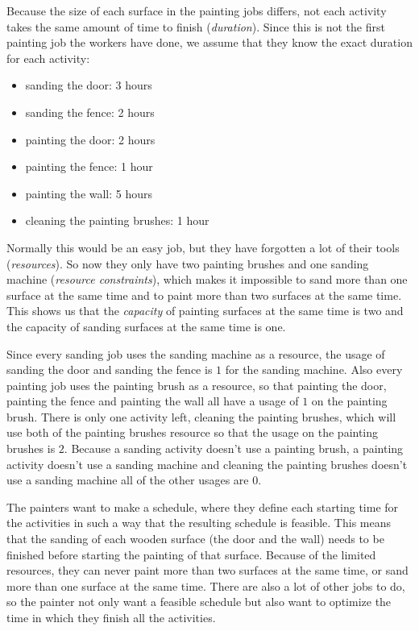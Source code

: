 \documentclass{article}
\theoremstyle{definition}
\begin{document}
Because the size of each surface in the painting jobs differs, not each activity takes the same amount of time to finish (\emph{duration}).
Since this is not the first painting job the workers have done, we assume that they know the exact duration for each activity:
\begin{itemize}
\item sanding the door: 3 hours
\item sanding the fence: 2 hours
\item painting the door: 2 hours
\item painting the fence: 1 hour
\item painting the wall: 5 hours
\item cleaning the painting brushes: 1 hour
\end{itemize}
Normally this would be an easy job, but they have forgotten a lot of their tools (\emph{resources}).
So now they only have two painting brushes and one sanding machine (\emph{resource constraints}), which makes it impossible to sand more than one surface at the same time and to paint more than two surfaces at the same time.
This shows us that the \emph{capacity} of painting surfaces at the same time is two and the capacity of sanding surfaces at the same time is one.

Since every sanding job uses the sanding machine as a resource, the usage of sanding the door and sanding the fence is $1$ for the sanding machine.
Also every painting job uses the painting brush as a resource, so that painting the door, painting the fence and painting the wall all have a usage of $1$ on the painting brush.
There is only one activity left, cleaning the painting brushes, which will use both of the painting brushes resource so that the usage on the painting brushes is $2$.
Because a sanding activity doesn't use a painting brush, a painting activity doesn't use a sanding machine and cleaning the painting brushes doesn't use a sanding machine all of the other usages are $0$.

The painters want to make a schedule, where they define each starting time for the activities in such a way that the resulting schedule is feasible.
This means that the sanding of each wooden surface (the door and the wall) needs to be finished before starting the painting of that surface.
Because of the limited resources, they can never paint more than two surfaces at the same time, or sand more than one surface at the same time.
There are also a lot of other jobs to do, so the painter not only want a feasible schedule but also want to optimize the time in which they finish all the activities.
\end{document}
